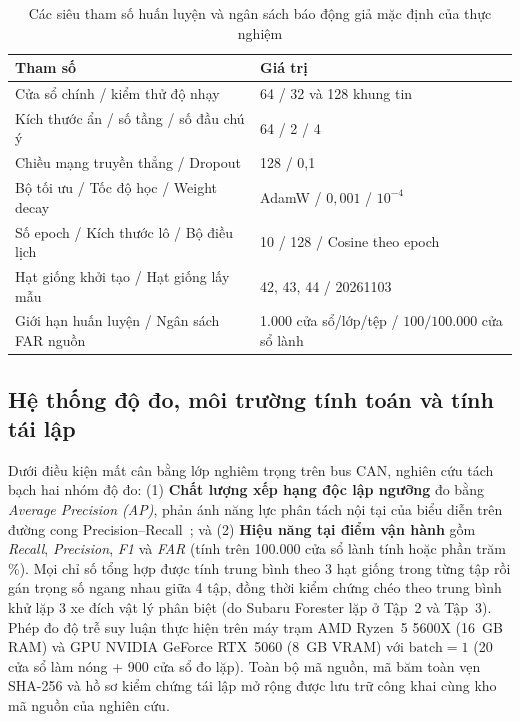 \documentclass[12pt, a4paper, reqno, oneside]{book}
\begin{document}
\begin{table}[htbp]
  \centering
  \caption[Siêu tham số huấn luyện và ngân sách báo động giả mặc định]{Các siêu tham số huấn luyện và ngân sách báo động giả mặc định của thực nghiệm}
  \label{tab:hyperparams}\label{tab:config}
  \footnotesize
  \begin{tabular}{@{}l l@{}}
    \toprule
    \textbf{Tham số} & \textbf{Giá trị} \\
    \midrule
    Cửa sổ chính / kiểm thử độ nhạy & 64 / 32 và 128 khung tin \\
    Kích thước ẩn / số tầng / số đầu chú ý & 64 / 2 / 4 \\
    Chiều mạng truyền thẳng / Dropout & 128 / 0,1 \\
    Bộ tối ưu / Tốc độ học / Weight decay & AdamW / $0{,}001$ / $10^{-4}$ \\
    Số epoch / Kích thước lô / Bộ điều lịch & 10 / 128 / Cosine theo epoch \\
    Hạt giống khởi tạo / Hạt giống lấy mẫu & 42, 43, 44 / 20261103 \\
    Giới hạn huấn luyện / Ngân sách FAR nguồn & 1.000 cửa sổ/lớp/tệp / $100/100.000$ cửa sổ lành \\
    \bottomrule
  \end{tabular}
\end{table}

\subsection{Hệ thống độ đo, môi trường tính toán và tính tái lập}\label{subsec:exp-metrics}

Dưới điều kiện mất cân bằng lớp nghiêm trọng trên bus CAN, nghiên cứu tách bạch hai nhóm độ đo: (1) \textbf{Chất lượng xếp hạng độc lập ngưỡng} đo bằng \textit{Average Precision (AP)}, phản ánh năng lực phân tách nội tại của biểu diễn trên đường cong Precision--Recall~\cite{saito2015pr}; và (2) \textbf{Hiệu năng tại điểm vận hành} gồm \textit{Recall}, \textit{Precision}, \textit{F1} và \textit{FAR} (tính trên 100.000 cửa sổ lành tính hoặc phần trăm \%). Mọi chỉ số tổng hợp được tính trung bình theo 3 hạt giống trong từng tập rồi gán trọng số ngang nhau giữa 4 tập, đồng thời kiểm chứng chéo theo trung bình khử lặp 3 xe đích vật lý phân biệt (do Subaru Forester lặp ở Tập~2 và Tập~3). Phép đo độ trễ suy luận thực hiện trên máy trạm AMD Ryzen~5 5600X (16~GB RAM) và GPU NVIDIA GeForce RTX~5060 (8~GB VRAM) với $\text{batch}=1$ (20 cửa sổ làm nóng + 900 cửa sổ đo lặp). Toàn bộ mã nguồn, mã băm toàn vẹn SHA-256 và hồ sơ kiểm chứng tái lập mở rộng được lưu trữ công khai cùng kho mã nguồn của nghiên cứu.
\end{document}
